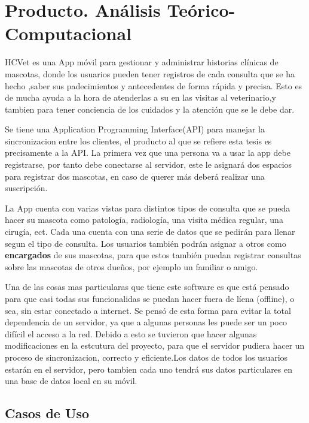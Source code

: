 \chapter{Producto. Análisis Teórico-Computacional}\label{chapter:proposal}

HCVet es una App móvil para gestionar y administrar historias clínicas de mascotas, donde los usuarios pueden tener registros de cada consulta que se ha hecho ,saber sus padecimientos y antecedentes de forma rápida y precisa. Esto es de mucha ayuda a la hora de atenderlas a su en las visitas al veterinario,y tambien para tener conciencia de los cuidados y la atención que se le debe dar.

Se tiene una Application Programming Interface(API) para manejar la sincronizacion entre los clientes, el producto al que se refiere esta tesis es precisamente a la API. La primera vez que una persona va a usar la app debe registrarse, por tanto debe conectarse al servidor, este le asignará dos espacios para registrar dos mascotas, en caso de querer más deberá realizar una suscripción.

La App cuenta con varias vistas para distintos tipos de consulta que se pueda hacer su mascota como patología, radiología, una visita médica regular, una cirugía, ect. Cada una cuenta con una serie de datos que se pedirán para llenar segun el tipo de consulta. Los usuarios también podrán asignar a otros como \textbf{encargados} de sus mascotas, para que estos también puedan registrar consultas sobre  las mascotas de otros dueños, por ejemplo un familiar o amigo.

Una de las cosas mas particularas que tiene este software es que está pensado para que casi todas sus funcionalidas se puedan hacer fuera de líena (offline), o sea, sin estar conectado a internet. Se pensó de esta forma para evitar la total dependencia de un servidor, ya que a algunas personas les puede ser un poco difícil el acceso a la red. Debido a esto se tuvieron que hacer algunas modificaciones en la estcutura del proyecto, para que el servidor pudiera hacer un proceso de sincronizacion, correcto y eficiente.Los datos de todos los usuarios estarán en el servidor, pero tambien cada uno tendrá sus datos particulares en una base de datos local en su móvil. 

\section{Casos de Uso}

